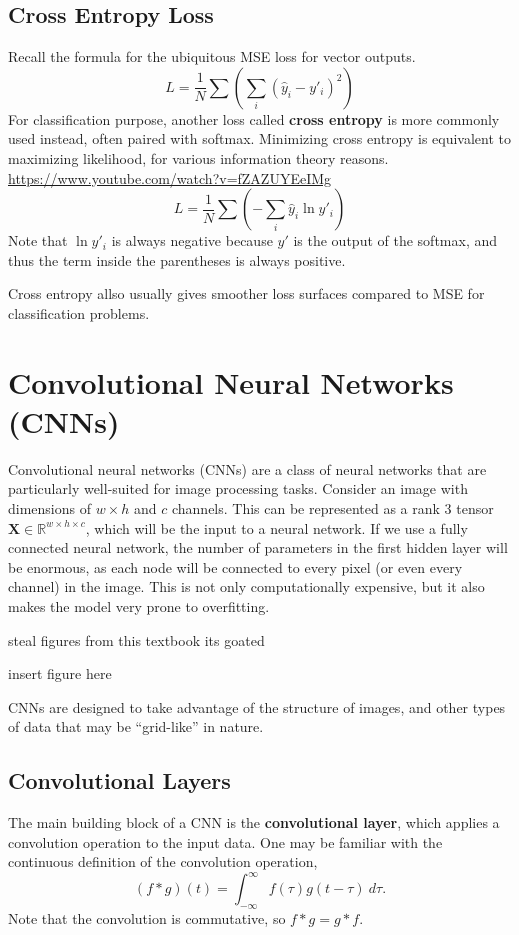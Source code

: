 \documentclass[12pt]{report}
\theoremstyle{definition}
\theoremstyle{remark}
\begin{document}
\subsection{Cross Entropy Loss}

Recall the formula for the ubiquitous MSE loss for vector outputs.
\begin{equation}
L = \frac{1}{N}\sum \left(\sum_i (\hat{y}_i-y'_i)^2\right)
\end{equation}
For classification purpose, another loss called \textbf{cross entropy} is more commonly used instead, often paired with softmax. Minimizing cross entropy is equivalent to maximizing likelihood, for various information theory reasons. \url{https://www.youtube.com/watch?v=fZAZUYEeIMg}
\begin{equation}
L = \frac{1}{N}\sum \left(-\sum_i \hat{y}_i \ln y'_i\right)
\end{equation}
Note that $\ln y'_i$ is always negative because $y'$ is the output of the softmax, and thus the term inside the parentheses is always positive.

Cross entropy allso usually gives smoother loss surfaces compared to MSE for classification problems.

\section{Convolutional Neural Networks (CNNs)}\label{sec:cnn}
Convolutional neural networks (CNNs) are a class of neural networks that are particularly well-suited for image processing tasks. Consider an image with dimensions of $w \times h$ and $c$ channels. This can be represented as a rank $3$ tensor $\mathbf{X} \in \mathbb{R}^{w \times h \times c}$, which will be the input to a neural network. If we use a fully connected neural network, the number of parameters in the first hidden layer will be enormous, as each node will be connected to every pixel (or even every channel) in the image. This is not only computationally expensive, but it also makes the model very prone to overfitting.

\cite{bishop_deep_2023} steal figures from this textbook its goated

insert figure here

CNNs are designed to take advantage of the structure of images, and other types of data that may be ``grid-like'' in nature.
\subsection{Convolutional Layers}
The main building block of a CNN is the \textbf{convolutional layer}, which applies a convolution operation to the input data. One may be familiar with the continuous definition of the convolution operation,
\begin{equation}
    (f * g)(t) = \int_{-\infty}^{\infty} f(\tau) g(t - \tau)\ d\tau.
\end{equation}
Note that the convolution is commutative, so $f * g = g * f$.
\end{document}
